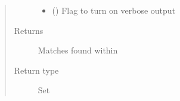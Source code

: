 \documentclass[letterpaper,10pt,english]{sphinxmanual}
\begin{document}
\begin{fulllineitems}
\begin{quote}
\begin{description}
\begin{itemize}
\item {} 
 (\sphinxstyleliteralemphasis{\sphinxupquote{, }}\sphinxstyleliteralemphasis{\sphinxupquote{, }}) \textendash{} Flag to turn on verbose output

\end{itemize}

\item[{Returns}] \leavevmode
{} \textendash{} Matches found within 

\item[{Return type}] \leavevmode
Set

\end{description}\end{quote}




{\hyperref[\detokenize{functions:pyresid.load_protein_IDs}]{}}



\end{fulllineitems}

\end{document}
